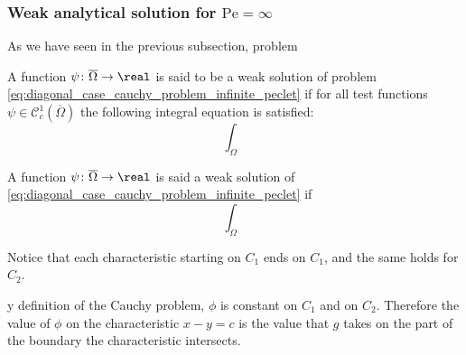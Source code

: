 \subsubsection{Weak analytical solution for \texorpdfstring{$\mathrm{Pe} =
\infty$}{infinite Péclet's number}}


As we have seen in the previous subsection, problem 

\begin{definition}
	A function $\psi \colon \overline{\Omega} \rightarrow \real$ is said to be a
	weak solution of problem
	\eqref{eq:diagonal_case_cauchy_problem_infinite_peclet} if for all test
	functions $\psi \in \mathcal{C}^1_c (\overline{\Omega})$ the following
	integral equation is satisfied:
	\begin{equation}
		\int_\Omega 
	\end{equation}
	
	A function $\psi \colon \overline{\Omega} \rightarrow \real$
	is said a weak solution of
	\eqref{eq:diagonal_case_cauchy_problem_infinite_peclet} if 
	\[
		\int_\Omega 
	\]
\end{definition}


Notice that each characteristic starting on $C_1$ ends on $C_1$, and the same
holds for $C_2$. 

y definition of the Cauchy problem, $\phi$ is
constant on $C_1$ and on $C_2$. Therefore the value of $\phi$ on the
characteristic $x - y = c$ is the value that $g$ takes on the part of the
boundary the characteristic intersects.